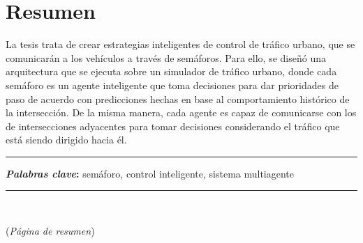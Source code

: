 \chapter*{Resumen} %
  La tesis trata de crear estrategias inteligentes de control de tráfico
  urbano, que se comunicarán a los vehículos a través de semáforos. Para
  ello, se diseñó una arquitectura que se ejecuta sobre un simulador de
  tráfico urbano, donde cada semáforo es un agente inteligente que toma
  decisiones para dar prioridades de paso de acuerdo con predicciones
  hechas en base al comportamiento histórico de la intersección. De la
  misma manera, cada agente es capaz de comunicarse con los de
  intersecciones adyacentes para tomar decisiones considerando el
  tráfico que está siendo dirigido hacia él.
\noindent \rule{0.9\textwidth}{1.0pt} \newline
\noindent \textbf{\textit{Palabras clave}: }\newline
  semáforo, control inteligente, sistema multiagente
\noindent \rule{0.9\textwidth}{1.0pt}
\ \newline
\par
\linespread{1.3}
{\Huge{(\textit{Página de resumen})}}
\clearpage %
